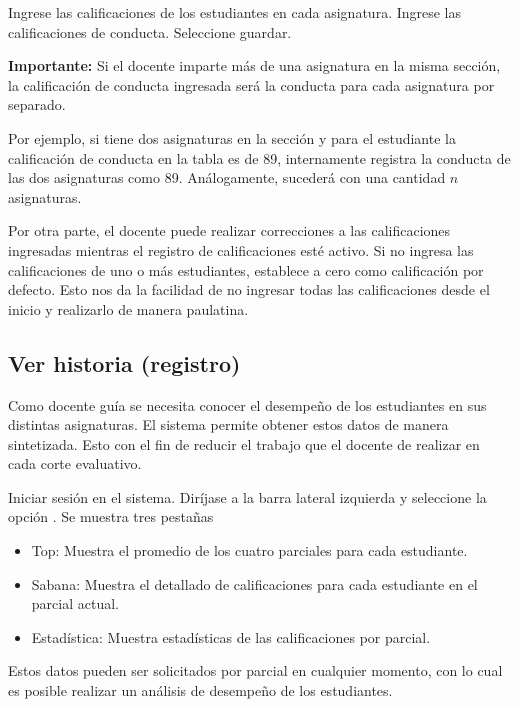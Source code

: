 \documentclass[12pt]{article}
\begin{document}
     Ingrese las calificaciones de los estudiantes en cada asignatura.
     Ingrese las calificaciones de conducta.
     Seleccione guardar.

    \textbf{Importante:} Si el docente imparte más de una asignatura en la misma sección, la calificación de conducta ingresada
    será la conducta para cada asignatura por separado.

    Por ejemplo, si tiene dos asignaturas en la sección y para el estudiante  la calificación
    de conducta en la tabla es de 89, \wsm internamente registra la conducta de las dos asignaturas como 89.
    Análogamente, sucederá con una cantidad $n$ asignaturas.

    Por otra parte, el docente puede realizar correcciones a las calificaciones ingresadas mientras el registro de
    calificaciones esté activo.
    Si no ingresa las calificaciones de uno o más estudiantes, \wsm establece a cero como calificación por defecto.
    Esto nos da la facilidad de no ingresar todas las calificaciones desde el inicio y realizarlo de manera paulatina.

    \subsection{Ver historia (registro)}

    Como docente guía se necesita conocer el desempeño de los estudiantes en sus distintas asignaturas.
    El sistema \wsm permite obtener estos datos de manera sintetizada.
    Esto con el fin de reducir el trabajo que el docente de realizar en cada corte evaluativo.

    \stepTitle
     Iniciar sesión en el sistema.
     Diríjase a la barra lateral izquierda y seleccione la opción .
     Se muestra tres pestañas
    \begin{itemize}
        \item Top: Muestra el promedio de los cuatro parciales para cada estudiante.
        \item Sabana: Muestra el detallado de calificaciones para cada estudiante en el parcial actual.
        \item Estadística: Muestra estadísticas de las calificaciones por parcial.
    \end{itemize}

    Estos datos pueden ser solicitados por parcial en cualquier momento, con lo cual es posible realizar un análisis
    de desempeño de los estudiantes.
\end{document}
